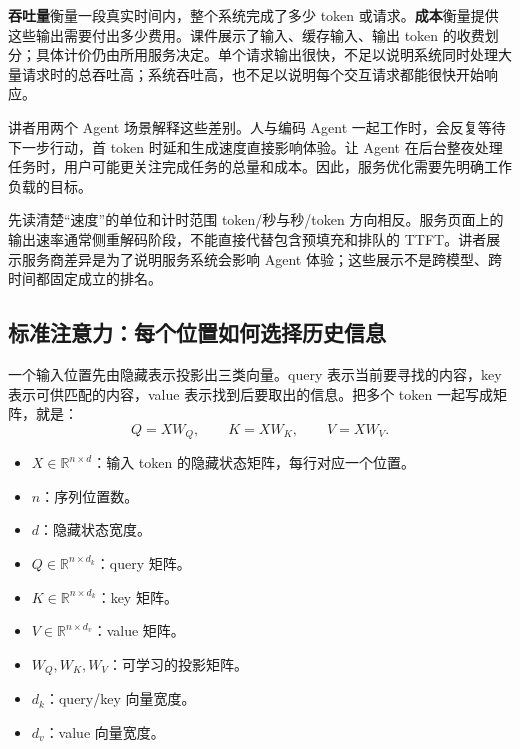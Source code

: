 \documentclass[11pt,a4paper]{article}
\begin{document}
\textbf{吞吐量}衡量一段真实时间内，整个系统完成了多少 token 或请求。\textbf{成本}衡量提供这些输出需要付出多少费用。课件展示了输入、缓存输入、输出 token 的收费划分；具体计价仍由所用服务决定。单个请求输出很快，不足以说明系统同时处理大量请求时的总吞吐高；系统吞吐高，也不足以说明每个交互请求都能很快开始响应。

讲者用两个 Agent 场景解释这些差别。人与编码 Agent 一起工作时，会反复等待下一步行动，首 token 时延和生成速度直接影响体验。让 Agent 在后台整夜处理任务时，用户可能更关注完成任务的总量和成本。因此，服务优化需要先明确工作负载的目标。

\begin{warningbox}{先读清楚“速度”的单位和计时范围}
token/秒与秒/token 方向相反。服务页面上的输出速率通常侧重解码阶段，不能直接代替包含预填充和排队的 TTFT。讲者展示服务商差异是为了说明服务系统会影响 Agent 体验；这些展示不是跨模型、跨时间都固定成立的排名。
\end{warningbox}

\subsection{标准注意力：每个位置如何选择历史信息}

一个输入位置先由隐藏表示投影出三类向量。query 表示当前要寻找的内容，key 表示可供匹配的内容，value 表示找到后要取出的信息。把多个 token 一起写成矩阵，就是：
$$
Q=XW_Q,\qquad K=XW_K,\qquad V=XW_V.
$$
\begin{itemize}
\item $X\in\mathbb{R}^{n\times d}$：输入 token 的隐藏状态矩阵，每行对应一个位置。
\item $n$：序列位置数。
\item $d$：隐藏状态宽度。
\item $Q\in\mathbb{R}^{n\times d_k}$：query 矩阵。
\item $K\in\mathbb{R}^{n\times d_k}$：key 矩阵。
\item $V\in\mathbb{R}^{n\times d_v}$：value 矩阵。
\item $W_Q,W_K,W_V$：可学习的投影矩阵。
\item $d_k$：query/key 向量宽度。
\item $d_v$：value 向量宽度。
\end{itemize}
\end{document}
